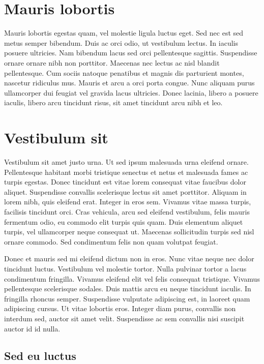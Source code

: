 \section{Mauris lobortis}

Mauris lobortis egestas quam, vel molestie ligula luctus eget. Sed nec est sed
metus semper bibendum. Duis ac orci odio, ut vestibulum lectus. In iaculis
posuere ultricies. Nam bibendum lacus sed orci pellentesque sagittis.
Suspendisse ornare ornare nibh non porttitor. Maecenas nec lectus ac nisl
blandit pellentesque. Cum sociis natoque penatibus et magnis dis parturient
montes, nascetur ridiculus mus. Mauris et arcu a orci porta congue. Nunc aliquam
purus ullamcorper dui feugiat vel gravida lacus ultricies. Donec lacinia, libero
a posuere iaculis, libero arcu tincidunt risus, sit amet tincidunt arcu nibh et
leo.

\section{Vestibulum sit}

Vestibulum sit amet justo urna. Ut sed ipsum malesuada urna eleifend ornare.
Pellentesque habitant morbi tristique senectus et netus et malesuada fames ac
turpis egestas. Donec tincidunt est vitae lorem consequat vitae faucibus dolor
aliquet. Suspendisse convallis scelerisque lectus sit amet porttitor. Aliquam in
lorem nibh, quis eleifend erat. Integer in eros sem. Vivamus vitae massa turpis,
facilisis tincidunt orci. Cras vehicula, arcu sed eleifend vestibulum, felis
mauris fermentum odio, eu commodo elit turpis quis quam. Duis elementum aliquet
turpis, vel ullamcorper neque consequat ut. Maecenas sollicitudin turpis sed
nisl ornare commodo. Sed condimentum felis non quam volutpat feugiat.

Donec et mauris sed mi eleifend dictum non in eros. Nunc vitae neque nec dolor
tincidunt luctus. Vestibulum vel molestie tortor. Nulla pulvinar tortor a lacus
condimentum fringilla. Vivamus eleifend elit vel felis consequat tristique.
Vivamus pellentesque scelerisque sodales. Duis mattis arcu eu neque tincidunt
iaculis. In fringilla rhoncus semper. Suspendisse vulputate adipiscing est, in
laoreet quam adipiscing cursus. Ut vitae lobortis eros. Integer diam purus,
convallis non interdum sed, auctor sit amet velit. Suspendisse ac sem convallis
nisi suscipit auctor id id nulla. 

\subsection{Sed eu luctus}

